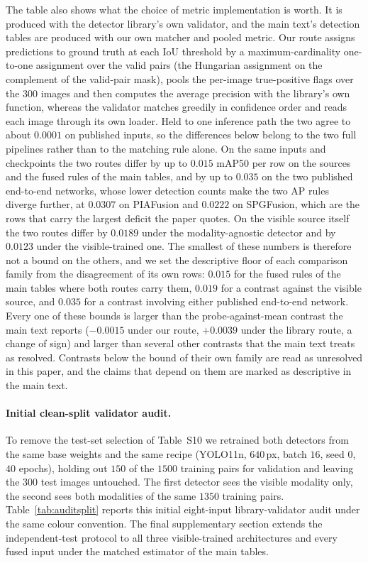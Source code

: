 \documentclass[preprint,12pt,a4paper]{elsarticle}
\begin{document}
The table also shows what the choice of metric implementation is worth. It is
produced with the detector library's own validator, and the main text's detection
tables are produced with our own matcher and pooled metric. Our route assigns
predictions to ground truth at each IoU threshold by a maximum-cardinality one-to-one
assignment over the valid pairs (the Hungarian assignment on the complement of the
valid-pair mask), pools the per-image true-positive flags over the 300 images and then
computes the average precision with the library's own function, whereas the validator
matches greedily in confidence order and reads each image through its own loader. Held
to one inference path the two agree to about $0.0001$ on published inputs, so the
differences below belong to the two full pipelines rather than to the matching rule
alone. On the same inputs and
checkpoints the two routes differ by up to $0.015$ mAP50 per row on the sources and
the fused rules of the main tables, and by up to $0.035$ on the two published
end-to-end networks, whose lower detection counts make the two AP rules diverge
further, at $0.0307$ on PIAFusion and $0.0222$ on SPGFusion, which are the rows that
carry the largest deficit the paper quotes. On the visible source itself the two
routes differ by $0.0189$ under the modality-agnostic detector and by $0.0123$ under
the visible-trained one. The smallest of these numbers is therefore not a bound on
the others, and we set the descriptive floor of each comparison family from the
disagreement of its own rows: $0.015$ for the fused rules of the main tables where
both routes carry them, $0.019$ for a contrast against the visible source, and
$0.035$ for a contrast involving either published end-to-end network. Every one of
these bounds is larger than the probe-against-mean contrast the main text reports
($-0.0015$ under our route, $+0.0039$ under the library route, a change of sign) and
larger than several other contrasts that the main text treats as resolved. Contrasts
below the bound of their own family are read as unresolved in this paper, and the
claims that depend on them are marked as descriptive in the main text.

\paragraph{Initial clean-split validator audit.}
To remove the test-set selection of Table~S10 we retrained both
detectors from the same base weights and the same recipe (YOLO11n, $640$\,px, batch
$16$, seed $0$, $40$ epochs), holding out $150$ of the $1500$ training pairs for
validation and leaving the $300$ test images untouched. The first detector sees the
visible modality only, the second sees both modalities of the same $1350$ training
pairs. Table~\ref{tab:auditsplit} reports this initial eight-input library-validator
audit under the same colour convention. The final supplementary section extends the
independent-test protocol to all three visible-trained architectures and every fused
input under the matched estimator of the main tables.
\end{document}
